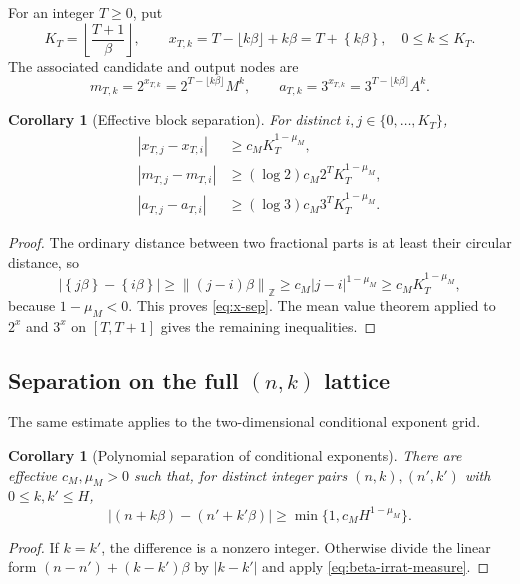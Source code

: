 \documentclass[11pt,oneside]{article}
\newtheorem{corollary}[theorem]{Corollary}
\theoremstyle{definition}
\theoremstyle{remark}
\newcommand{\Z}{\mathbb Z}
\newcommand{\fract}[1]{\left\{#1\right\}}
\newcommand{\distZ}[1]{\left\lVert #1\right\rVert_{\Z}}
\begin{document}
For an integer $T\ge0$, put
\[
  K_T=\left\lfloor\frac{T+1}{\beta}\right\rfloor,
  \qquad
  x_{T,k}=T-\lfloor k\beta\rfloor+k\beta
         =T+\fract{k\beta},
  \quad 0\le k\le K_T.
\]
The associated candidate and output nodes are
\begin{equation}\label{eq:block-pairs}
  m_{T,k}=2^{x_{T,k}}=2^{T-\lfloor k\beta\rfloor}M^k,
  \qquad
  a_{T,k}=3^{x_{T,k}}=3^{T-\lfloor k\beta\rfloor}A^k.
\end{equation}

\begin{corollary}[Effective block separation]\label{cor:block-separation}
For distinct $i,j\in\{0,\ldots,K_T\}$,
\begin{align}
 |x_{T,j}-x_{T,i}|&\ge c_MK_T^{1-\mu_M},\label{eq:x-sep}\\
 |m_{T,j}-m_{T,i}|&\ge (\log2)c_M2^T K_T^{1-\mu_M},\label{eq:m-sep}\\
 |a_{T,j}-a_{T,i}|&\ge (\log3)c_M3^T K_T^{1-\mu_M}.
 \label{eq:a-sep}
\end{align}
\end{corollary}

\begin{proof}
The ordinary distance between two fractional parts is at least their circular distance, so
\[
 |\fract{j\beta}-\fract{i\beta}|
 \ge\distZ{(j-i)\beta}
 \ge c_M|j-i|^{1-\mu_M}
 \ge c_MK_T^{1-\mu_M},
\]
because $1-\mu_M<0$.  This proves \eqref{eq:x-sep}.  The mean value theorem applied to $2^x$
and $3^x$ on $[T,T+1]$ gives the remaining inequalities.
\end{proof}

\subsection{Separation on the full \texorpdfstring{$(n,k)$}{(n,k)} lattice}

The same estimate applies to the two-dimensional conditional exponent grid.

\begin{corollary}[Polynomial separation of conditional exponents]\label{cor:grid-separation}
There are effective $c_M,\mu_M>0$ such that, for distinct integer pairs
$(n,k),(n',k')$ with $0\le k,k'\le H$,
\[
  |(n+k\beta)-(n'+k'\beta)|
  \ge \min\{1,c_MH^{1-\mu_M}\}.
\]
\end{corollary}

\begin{proof}
If $k=k'$, the difference is a nonzero integer.  Otherwise divide the linear form
$(n-n')+(k-k')\beta$ by $|k-k'|$ and apply
\eqref{eq:beta-irrat-measure}.
\end{proof}
\end{document}
